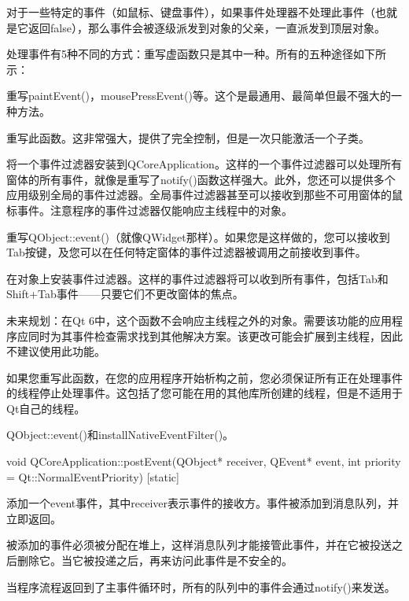 对于一些特定的事件（如鼠标、键盘事件），如果事件处理器不处理此事件（也就是它返回false），那么事件会被逐级派发到对象的父亲，一直派发到顶层对象。

处理事件有5种不同的方式：重写虚函数只是其中一种。所有的五种途径如下所
示：

\begin{compactenum}
\item 重写paintEvent()，mousePressEvent()等。这个是最通用、最简单但最不强大的一种方法。
\item 重写此函数。这非常强大，提供了完全控制，但是一次只能激活一个子类。
\item 将一个事件过滤器安装到QCoreApplication。这样的一个事件过滤器可以处理所有窗体的所有事件，就像是重写了notify()函数这样强大。此外，您还可以提供多个应用级别全局的事件过滤器。全局事件过滤器甚至可以接收到那些不可用窗体的鼠标事件。注意程序的事件过滤器仅能响应主线程中的对象。
\item 重写QObject::event()（就像QWidget那样）。如果您是这样做的，您可以接收到Tab按键，及您可以在任何特定窗体的事件过滤器被调用之前接收到事件。
\item 在对象上安装事件过滤器。这样的事件过滤器将可以收到所有事件，包括Tab和Shift+Tab事件——只要它们不更改窗体的焦点。
\end{compactenum}


未来规划：在Qt 6中，这个函数不会响应主线程之外的对象。需要该功能的应用程序应同时为其事件检查需求找到其他解决方案。该更改可能会扩展到主线程，因此不建议使用此功能。

\begin{notice}
如果您重写此函数，在您的应用程序开始析构之前，您必须保证所有正在处理事件的线程停止处理事件。这包括了您可能在用的其他库所创建的线程，但是不适用于Qt自己的线程。
\end{notice}


\begin{notice}[另请参阅]
QObject::event()和installNativeEventFilter()。
\end{notice}


void QCoreApplication::postEvent(QObject* receiver, QEvent* event, int priority = Qt::NormalEventPriority) [static]

添加一个event事件，其中receiver表示事件的接收方。事件被添加到消息队列，并立即返回。

被添加的事件必须被分配在堆上，这样消息队列才能接管此事件，并在它被投送之后删除它。当它被投递之后，再来访问此事件是不安全的。

当程序流程返回到了主事件循环时，所有的队列中的事件会通过notify()来发送。

